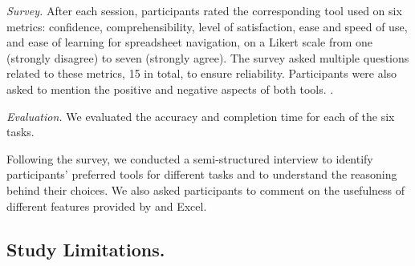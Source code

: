 
\emph{Survey.} After each session, 
participants rated the corresponding tool used on six metrics: 
confidence, comprehensibility, level of satisfaction, 
ease and speed of use, and ease of learning for spreadsheet navigation, 
on a Likert scale from one (\eg strongly disagree) to seven (\eg strongly agree). 
The survey asked multiple questions related to these metrics, 
15 in total, to ensure reliability. 
Participants were also asked to mention the positive 
and negative aspects of both tools. 
.

\emph{Evaluation.} 
We evaluated the accuracy and
completion time for each of the six tasks. 

Following the survey, we conducted a semi-structured interview to 
identify participants’ preferred tools for different tasks 
and to understand the reasoning behind their choices. 
We also asked participants to comment on the usefulness of 
different features provided by \noah and Excel. 

\subsection{Study Limitations.}

